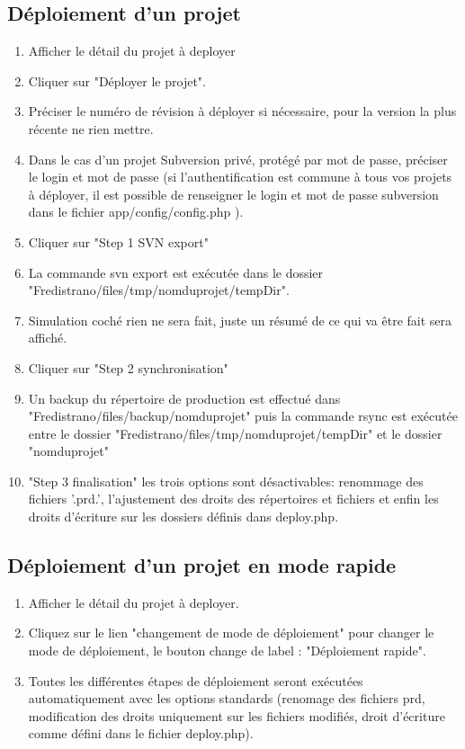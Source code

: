 \documentclass[12pt,a4paper]{report}
\begin{document}
\subsection{Déploiement d'un projet}
\begin{enumerate}
\item Afficher le détail du projet à deployer
\item Cliquer sur "Déployer le projet".
\item Préciser le numéro de révision à déployer si nécessaire, pour la version la plus récente ne rien mettre.
\item Dans le cas d'un projet Subversion privé, protégé par mot de passe, préciser le login et mot de passe (si l'authentification est commune à tous vos projets à déployer, il est possible de renseigner le login et mot de passe subversion dans le fichier app/config/config.php ).
\item Cliquer sur "Step 1 SVN export"
\item La commande svn export est exécutée dans le dossier "Fredistrano/files/tmp/nomduprojet/tempDir".
\item Simulation coché rien ne sera fait, juste un résumé de ce qui va être fait sera affiché.
\item Cliquer sur "Step 2 synchronisation"
\item Un backup du répertoire de production est effectué dans "Fredistrano/files/backup/nomduprojet" puis la commande rsync est exécutée entre le dossier "Fredistrano/files/tmp/nomduprojet/tempDir" et le dossier "nomduprojet"
\item "Step 3 finalisation" les trois options sont désactivables: renommage des fichiers '.prd.', l'ajustement des droits des répertoires et fichiers et enfin les droits d'écriture sur les dossiers définis dans deploy.php.
\end{enumerate}

\subsection{Déploiement d'un projet en mode rapide}
\begin{enumerate}
\item Afficher le détail du projet à deployer.
\item Cliquez sur le lien "changement de mode de déploiement" pour changer le mode de déploiement, le bouton change de label : "Déploiement rapide".
\item Toutes les différentes étapes de déploiement seront exécutées automatiquement avec les options standards (renomage des fichiers prd, modification des droits uniquement sur les fichiers modifiés, droit d'écriture comme défini dans le fichier deploy.php). 
\end{enumerate}
\end{document}
